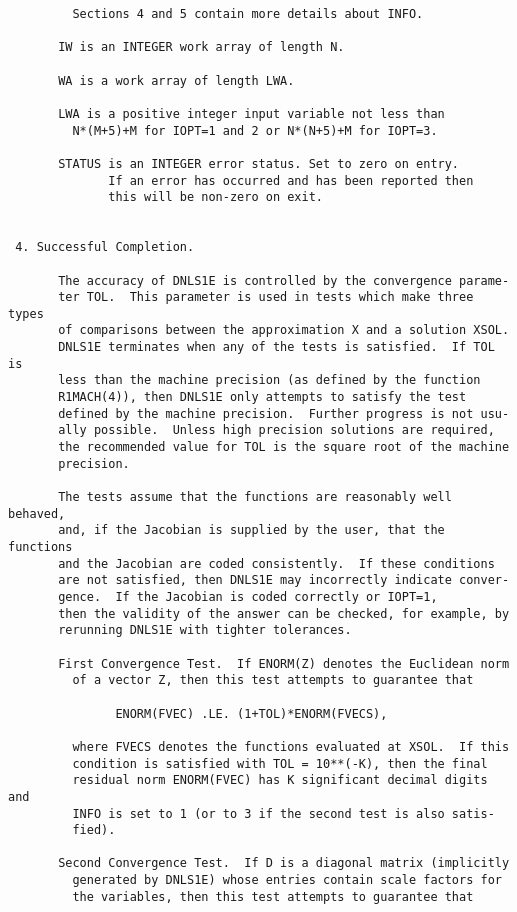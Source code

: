 \begin{verbatim}
         Sections 4 and 5 contain more details about INFO.

       IW is an INTEGER work array of length N.

       WA is a work array of length LWA.

       LWA is a positive integer input variable not less than
         N*(M+5)+M for IOPT=1 and 2 or N*(N+5)+M for IOPT=3.

       STATUS is an INTEGER error status. Set to zero on entry.
              If an error has occurred and has been reported then
              this will be non-zero on exit.


 4. Successful Completion.

       The accuracy of DNLS1E is controlled by the convergence parame-
       ter TOL.  This parameter is used in tests which make three types
       of comparisons between the approximation X and a solution XSOL.
       DNLS1E terminates when any of the tests is satisfied.  If TOL is
       less than the machine precision (as defined by the function
       R1MACH(4)), then DNLS1E only attempts to satisfy the test
       defined by the machine precision.  Further progress is not usu-
       ally possible.  Unless high precision solutions are required,
       the recommended value for TOL is the square root of the machine
       precision.

       The tests assume that the functions are reasonably well behaved,
       and, if the Jacobian is supplied by the user, that the functions
       and the Jacobian are coded consistently.  If these conditions
       are not satisfied, then DNLS1E may incorrectly indicate conver-
       gence.  If the Jacobian is coded correctly or IOPT=1,
       then the validity of the answer can be checked, for example, by
       rerunning DNLS1E with tighter tolerances.

       First Convergence Test.  If ENORM(Z) denotes the Euclidean norm
         of a vector Z, then this test attempts to guarantee that

               ENORM(FVEC) .LE. (1+TOL)*ENORM(FVECS),

         where FVECS denotes the functions evaluated at XSOL.  If this
         condition is satisfied with TOL = 10**(-K), then the final
         residual norm ENORM(FVEC) has K significant decimal digits and
         INFO is set to 1 (or to 3 if the second test is also satis-
         fied).

       Second Convergence Test.  If D is a diagonal matrix (implicitly
         generated by DNLS1E) whose entries contain scale factors for
         the variables, then this test attempts to guarantee that


\end{verbatim}

